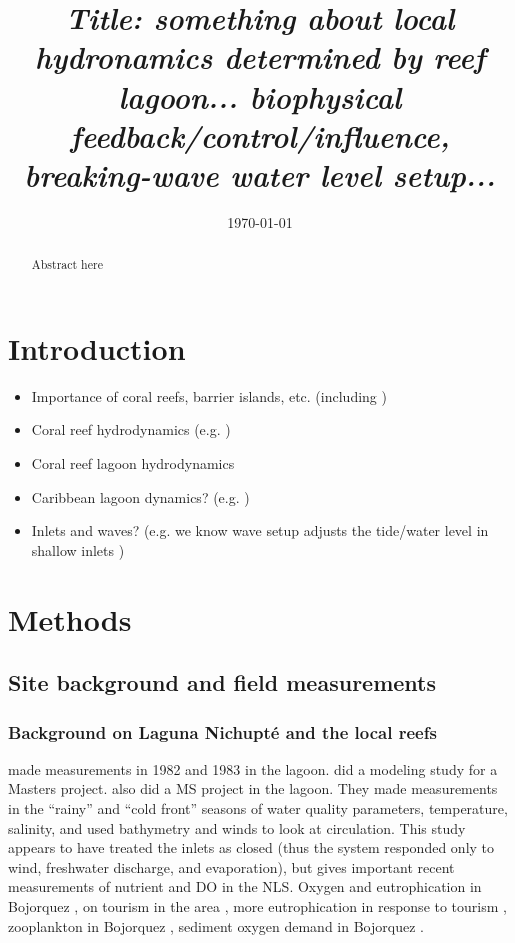 \documentclass[11pt]{article}
\begin{document}
\title{\textit{Title: something about local hydronamics determined by reef lagoon... biophysical feedback/control/influence, breaking-wave water level setup...}}
\author{}

\date{\today}

\maketitle

\begin{abstract}
Abstract here
\end{abstract}

\section{Introduction}

\begin{itemize}
	\item Importance of coral reefs, barrier islands, etc. (including \citep{guannel16})
	\item Coral reef hydrodynamics (e.g. \citep{gourlay96, symonds05})
	\item Coral reef lagoon hydrodynamics
	\item Caribbean lagoon dynamics? (e.g. \citep{ocallaghan07})
	\item Inlets and waves? (e.g. we know wave setup adjusts the tide/water level in shallow inlets \citep{williams16})
\end{itemize}

\section{Methods}



\subsection{Site background and field measurements}
\subsubsection{Background on Laguna Nichupt{\'e} and the local reefs}

\citet{merino90} made measurements in 1982 and 1983 in the lagoon. \citet{pedrozoacuna08} did a modeling study for a Masters project. \citet{romerosierra18} also did a MS project in the lagoon. They made measurements in the ``rainy'' and ``cold front'' seasons of water quality parameters, temperature, salinity, and used bathymetry and winds to look at circulation. This study appears to have treated the inlets as closed (thus the system responded only to wind, freshwater discharge, and evaporation), but gives important recent measurements of nutrient and DO in the NLS. Oxygen and eutrophication in Bojorquez \citep{reyes91}, on tourism in the area \citep{torres05}, more eutrophication in response to tourism \citep{merino92}, zooplankton in Bojorquez \citep{alvarezcadena96}, sediment oxygen demand in Bojorquez \citep{valdeslozano06}. 
\end{document}
